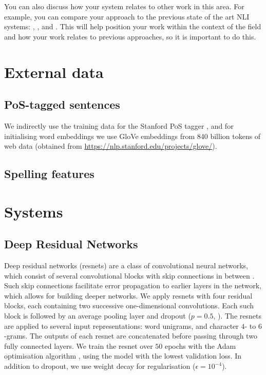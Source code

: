 \documentclass[11pt,letterpaper]{article}
\begin{document}
You can also discuss how your system relates to other work in this area. For example, you can compare your approach to the previous state of the art NLI systems: \cite{malmasi:2017:nlisg}, \cite{ionescu:2014}, \cite{bykh:2014} and \cite{jarvis-bestgen-pepper:2013:BEA8}.
This will help position your work within the context of the field and how your work relates to previous approaches, so it is important to do this.

\section{External data}
\subsection{PoS-tagged sentences}
We indirectly use the training data for the Stanford PoS tagger
\citep{Manning2014corenlp}, and for initialising word embeddings we use
GloVe embeddings from 840 billion tokens of web data (obtained from
\url{https://nlp.stanford.edu/projects/glove/}).

\subsection{Spelling features}

\section{Systems}
\subsection{Deep Residual Networks}

Deep residual networks (resnets) are a class of convolutional neural networks, which consist of several convolutional blocks with skip connections in between \citep{He2016identity}.
Such skip connections facilitate error propagation to earlier layers in the network, which allows for building deeper networks.
We apply resnets with four residual blocks, each containing two successive one-dimensional convolutions.
Each such block is followed by an average pooling layer and dropout ($p=0.5$, \citet{dropout}).
The resnets are applied to several input representations: word unigrams, and character $4$- to $6$-grams.
The outputs of each resnet are concatenated before passing through two fully connected layers.
We train the resnet over $50$ epochs with the Adam optimisation algorithm \citep{adam}, using the model with the lowest validation loss.
In addition to dropout, we use weight decay for regularisation ($\epsilon=10^{-4}$).
\end{document}
